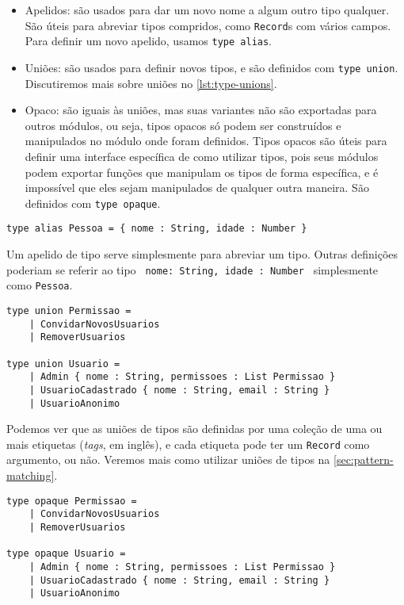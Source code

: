 \begin{itemize}
    \item Apelidos: são usados para dar um novo nome a algum outro tipo qualquer.
          São úteis para abreviar tipos compridos, como \texttt{Record}s com vários
          campos. Para definir um novo apelido, usamos \texttt{type alias}.
    \item Uniões: são usados para definir novos tipos, e são definidos com \texttt{type union}.
          Discutiremos mais sobre uniões no \autoref{lst:type-unions}.
    \item Opaco: são iguais às uniões, mas suas variantes não são exportadas para
          outros módulos, ou seja, tipos opacos só podem ser construídos e manipulados
          no módulo onde foram definidos. Tipos opacos são úteis para definir uma interface
          específica de como utilizar tipos, pois seus módulos podem exportar funções
          que manipulam os tipos de forma específica, e é impossível que eles sejam manipulados
          de qualquer outra maneira. São definidos com \texttt{type opaque}.
\end{itemize}


\begin{lstlisting}[label={lst:type-alias},caption={Exemplo de apelido de tipo}]
type alias Pessoa = { nome : String, idade : Number }
\end{lstlisting}

Um apelido de tipo serve simplesmente para abreviar um tipo. Outras definições
poderiam se referir ao tipo \texttt{{ nome: String, idade : Number }} simplesmente
como \texttt{Pessoa}.

\begin{lstlisting}[label={lst:type-unions},caption={Exemplo de união de tipos}]
type union Permissao =
    | ConvidarNovosUsuarios
    | RemoverUsuarios

type union Usuario =
    | Admin { nome : String, permissoes : List Permissao }
    | UsuarioCadastrado { nome : String, email : String }
    | UsuarioAnonimo
\end{lstlisting}

Podemos ver que as uniões de tipos são definidas por uma coleção de uma ou mais
etiquetas (\textit{tags}, em inglês), e cada etiqueta pode ter um \texttt{Record}
como argumento, ou não. Veremos mais como utilizar uniões de tipos na
\autoref{sec:pattern-matching}.

\begin{lstlisting}[label={lst:type-opaque},caption={Exemplo de tipos opacos}]
type opaque Permissao =
    | ConvidarNovosUsuarios
    | RemoverUsuarios

type opaque Usuario =
    | Admin { nome : String, permissoes : List Permissao }
    | UsuarioCadastrado { nome : String, email : String }
    | UsuarioAnonimo
\end{lstlisting}

